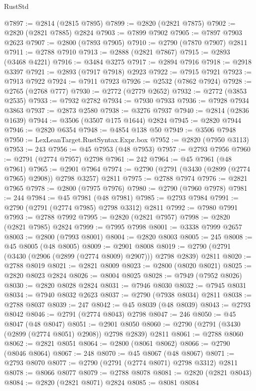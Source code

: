 \begin{lexlean}{RustStd}
\begin{coremodule}
@7897 := @2814 (@2815 @7895)
@7899 := @2820 (@2821 @7875)
@7902 := @2820 (@2821 @7885) @2824
@7903 := @7899 @7902
@7905 := @7897 @7903 @2623
@7907 := @2800 (@7893 @7905)
@7910 := @2790 (@7870 @7907) @2811
@7911 := @2788 @7910
@7913 := @2888 (@2821 @7867)
@7915 := @2893 (@3468 @4221)
@7916 := @3484 @3275
@7917 := @2894 @7916
@7918 := @2918 @3397
@7921 := @2893 (@7917 @7918) @2923
@7922 := @7915 @7921
@7923 := @7913 @7922
@7924 := @7911 @7923
@7926 := @2532 (@7862 @7924)
@7928 := @2765 (@2768 @777)
@7930 := @2772 (@2779 @2652)
@7932 := @2772 (@3853 @2535)
@7933 := @7932 @2782
@7934 := @7930 @7933
@7936 := @7928 @7934 @3863
@7937 := @2873 @2580
@7938 := @3276 @7937
@7940 := @2814 (@2836 @1639)
@7944 := @3506 (@3507 @175 @1644) @2824
@7945 := @2820 @7944
@7946 := @2820 @6354
@7948 := @4854 @138 @50
@7949 := @3506 @7948
@7950 := LexLeanTarget.RustSyntax.Expr.box
@7952 := @2820 (@7950 @3113)
@7953 := 243
@7956 := @45 @7953 (@48 @7953)
@7957 := @2793 @7956
@7960 := @2791 (@2774 @7957) @2798
@7961 := 242
@7964 := @45 @7961 (@48 @7961)
@7965 := @2901 @7964
@7974 := @2790 (@2791 (@3430 (@2899 (@2774 @7965) @2908)) @2798 @3257) @2811
@7975 := @2788 @7974
@7976 := @2821 @7965
@7978 := @2800 (@7975 @7976)
@7980 := @2790 (@7960 @7978)
@7981 := 244
@7984 := @45 @7981 (@48 @7981)
@7985 := @2793 @7984
@7991 := @2790 (@2791 (@2774 @7985) @2798 @3312) @2811
@7992 := @7980 @7991
@7993 := @2788 @7992
@7995 := @2820 (@2821 @7957)
@7998 := @2820 (@2821 @7985) @2824
@7999 := @7995 @7998
@8001 := @3338 @7999 @2657
@8003 := @2800 (@7993 @8001)
@8004 := @2820 @8003
@8005 := 245
@8008 := @45 @8005 (@48 @8005)
@8009 := @2901 @8008
@8019 := @2790 (@2791 (@3430 (@2906 (@2899 (@2774 @8009) @2907))) @2798 @2839) @2811
@8020 := @2788 @8019
@8021 := @2821 @8009
@8023 := @2800 (@8020 @8021)
@8025 := @2820 @8023 @2824
@8026 := @8004 @8025
@8028 := @7949 (@7952 @8026)
@8030 := @2820 @8028 @2824
@8031 := @7946 @8030
@8032 := @7945 @8031
@8034 := @7940 @8032 @2623
@8037 := @2790 (@7938 @8034) @2811
@8038 := @2788 @8037
@8039 := 247
@8042 := @45 @8039 (@48 @8039)
@8043 := @2793 @8042
@8046 := @2791 (@2774 @8043) @2798
@8047 := 246
@8050 := @45 @8047 (@48 @8047)
@8051 := @2901 @8050
@8060 := @2790 (@2791 (@3430 (@2899 (@2774 @8051) @2908)) @2798 @2839) @2811
@8061 := @2788 @8060
@8062 := @2821 @8051
@8064 := @2800 (@8061 @8062)
@8066 := @2790 (@8046 @8064)
@8067 := 248
@8070 := @45 @8067 (@48 @8067)
@8071 := @2793 @8070
@8077 := @2790 (@2791 (@2774 @8071) @2798 @3312) @2811
@8078 := @8066 @8077
@8079 := @2788 @8078
@8081 := @2820 (@2821 @8043)
@8084 := @2820 (@2821 @8071) @2824
@8085 := @8081 @8084

\end{coremodule}
\end{lexlean}
